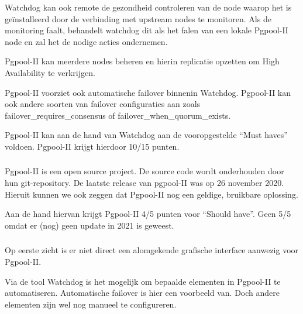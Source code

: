 Watchdog kan ook remote de gezondheid controleren van de node waarop het is geïnstalleerd door de verbinding met upstream nodes te monitoren. Als de monitoring faalt, behandelt watchdog dit als het falen van een lokale Pgpool-II node en zal het de nodige acties ondernemen.

Pgpool-II kan meerdere nodes beheren en hierin replicatie opzetten om High Availability te verkrijgen.

Pgpool-II voorziet ook automatische failover binnenin Watchdog. Pgpool-II kan ook andere soorten van failover configuraties aan zoals failover\_requires\_consensus of failover\_when\_quorum\_exists. 

Pgpool-II kan aan de hand van Watchdog aan de vooropgestelde “Must haves” voldoen. Pgpool-II krijgt hierdoor 10/15 punten.

\subsubsection{}
\label{subsubsec:Should have}

Pgpool-II is een open source project. De source code wordt onderhouden door hun git-repository.
De laatste release van pgpool-II was op 26 november 2020. Hieruit kunnen we ook zeggen dat Pgpool-II nog een geldige, bruikbare oplossing.

Aan de hand hiervan krijgt Pgpool-II 4/5 punten voor “Should have”. Geen 5/5 omdat er (nog) geen update in 2021 is geweest.

\subsubsection{}
\label{subsubsec:Could have}
Op eerste zicht is er niet direct een alomgekende grafische interface aanwezig voor Pgpool-II.

Via de tool Watchdog is het mogelijk om bepaalde elementen in Pgpool-II te automatiseren. Automatische failover is hier een voorbeeld van. Doch andere elementen zijn wel nog manueel te configureren.

\subsection{}
\label{subsec:Oplossing 3: PostgreSQL Automatic Failover (PAF)}


